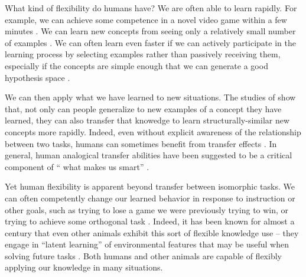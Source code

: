 What kind of flexibility do humans have? We are often able to learn rapidly. For example, we can achieve some competence in a novel video game within a few minutes \citep{Lake2016}. We can learn new concepts from seeing only a relatively small number of examples \citep[e.g.][]{Bourne1970}. We can often learn even faster if we can actively participate in the learning process by selecting examples rather than passively receiving them, especially if the concepts are simple enough that we can generate a good hypothesis space \citep{Markant2014a}. \par
We can then apply what we have learned to new situations. The studies of \citet{Bourne1970} show that, not only can people generalize to new examples of a concept they have learned, they can also transfer that knowedge to learn structurally-similar new concepts more rapidly. Indeed, even without explicit awareness of the relationship between two tasks, humans can sometimes benefit from transfer effects \citep[e.g.][]{Day2011}. In general, human analogical transfer abilities have been suggested to be a critical component of `` what makes us smart'' \citep{Gentner2003}. \par
Yet human flexibility is apparent beyond transfer between isomorphic tasks. We can often competently change our learned behavior in response to instruction or other goals, such as trying to lose a game we were previously trying to win, or trying to achieve some orthogonal task \citep{Lake2016}. Indeed, it has been known for almost a century that even other animals exhibit this sort of flexible knowledge use -- they engage in ``latent learning'' of environmental features that may be useful when solving future tasks \citep{Blodgett1929}. Both humans and other animals are capable of flexibly applying our knowledge in many situations.  \par
